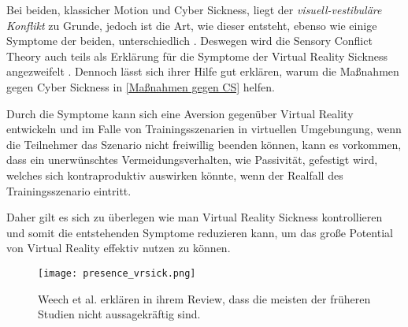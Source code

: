 Bei beiden, klassicher Motion und Cyber Sickness, liegt der \textit{visuell-vestibul\"are Konflikt} zu Grunde, jedoch ist die Art, wie dieser entsteht, ebenso wie einige Symptome der beiden, unterschiedlich \cite{Stanney:1997:MSCSSS}. Deswegen wird die Sensory Conflict Theory auch teils als Erkl\"arung f\"ur die Symptome der Virtual Reality Sickness angezweifelt  \cite{Kolasinski:1998:SympCS}. Dennoch l\"asst sich ihrer Hilfe gut erkl\"aren, warum die Ma{\ss}nahmen gegen Cyber Sickness in  \autoref{Maßnahmen gegen CS} helfen.

Durch die Symptome kann sich eine Aversion gegen\"uber Virtual Reality entwickeln und im Falle von Trainingsszenarien in virtuellen Umgebungung, wenn die Teilnehmer das Szenario nicht freiwillig beenden k\"onnen, kann es vorkommen, dass ein unerw\"unschtes Vermeidungsverhalten, wie Passivit\"at, gefestigt wird\cite{Crowley:1987:Avoid}, welches sich kontraproduktiv auswirken k\"onnte, wenn der Realfall des Trainingsszenario eintritt.

Daher gilt es sich zu \"uberlegen wie man Virtual Reality Sickness kontrollieren und somit die entstehenden Symptome reduzieren kann, um das gro{\ss}e Potential von Virtual Reality effektiv nutzen zu können.


\begin{figure}[bt]
	\centering 
	\texttt{[image: presence\_vrsick.png]}
	\caption{Weech et al.\cite{Weech:2019:PresenceCS} erkl\"aren in ihrem Review, dass die meisten der fr\"uheren Studien nicht aussagekr\"aftig sind.}
	\label{abb:presence_vrsick}
\end{figure}

